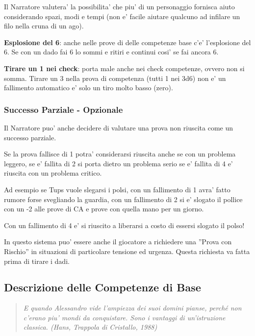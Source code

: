 \documentclass[a4paper,11pt,twoside,openany]{book}
\begin{document}
	Il Narratore valutera' la possibilita' che piu' di un personaggio fornisca aiuto considerando spazi, modi e tempi (non e' facile aiutare qualcuno ad infilare un filo nella cruna di un ago).
	
	\textbf{Esplosione del 6}: anche nelle prove di delle competenze base c'e' l'esplosione del 6. Se con un dado fai 6 lo sommi e ritiri e continui cosi' se fai ancora 6.
	
	\textbf{Tirare un 1 nei check}: porta male anche nei check competenze, ovvero non si somma.
	Tirare un 3 nella prova di competenza (tutti 1 nei 3d6) non e' un fallimento automatico e' solo un tiro molto basso (zero).
	
	\subsubsection{Successo Parziale - Opzionale}
	
	Il Narratore puo' anche decidere di valutare una prova non riuscita come un successo parziale.
	
	Se la prova fallisce di 1 potra' considerarsi riuscita anche se con un problema leggero, se e' fallita di 2 si porta dietro un problema serio se e' fallita di 4 e' riuscita con un problema critico.
	
	Ad esempio se Tups vuole slegarsi i polsi, con un fallimento di 1 avra' fatto rumore forse svegliando la guardia, con un fallimento di 2 si e' slogato il pollice con un -2 alle prove di CA e prove con quella mano per un giorno.
	
	Con un fallimento di 4 e' si riuscito a liberarsi a costo di essersi slogato il polso!
	
	
	In questo sistema puo' essere anche il giocatore a richiedere una ''Prova con Rischio'' in situazioni di particolare tensione ed urgenza. Questa richiesta va fatta prima di tirare i dadi.
	
	\pagebreak
	
	\subsection{Descrizione delle Competenze di Base}
	
	\label{descrizione-delle-competenze-di-base}
	\begin{quote}\textit{
			E quando Alessandro vide l'ampiezza dei suoi domini pianse, perché non c'erano piu' mondi da conquistare. Sono i vantaggi di un'istruzione classica. (Hans, Trappola di Cristallo, 1988)
	}\end{quote}
	
\end{document}
